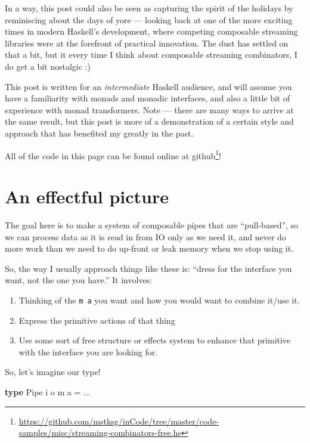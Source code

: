 \documentclass[]{article}
\newenvironment{Shaded}{}{}
\newcommand{\DataTypeTok}[1]{\textcolor[rgb]{0.56,0.13,0.00}{#1}}
\newcommand{\KeywordTok}[1]{\textcolor[rgb]{0.00,0.44,0.13}{\textbf{#1}}}
\newcommand{\NormalTok}[1]{#1}
\newcommand{\OperatorTok}[1]{\textcolor[rgb]{0.40,0.40,0.40}{#1}}
\newcommand{\OtherTok}[1]{\textcolor[rgb]{0.00,0.44,0.13}{#1}}
\renewcommand{\href}[2]{#2\footnote{\url{#1}}}
\begin{document}
In a way, this post could also be seen as capturing the spirit of the holidays
by reminiscing about the days of yore --- looking back at one of the more
exciting times in modern Haskell's development, where competing composable
streaming libraries were at the forefront of practical innovation. The dust has
settled on that a bit, but it every time I think about composable streaming
combinators, I do get a bit nostalgic :)

This post is written for an \emph{intermediate} Haskell audience, and will
assume you have a familiarity with monads and monadic interfaces, and also a
little bit of experience with monad transformers. Note --- there are many ways
to arrive at the same result, but this post is more of a demonstration of a
certain style and approach that has benefited my greatly in the past.

All of the code in this page
\href{https://github.com/mstksg/inCode/tree/master/code-samples/misc/streaming-combinators-free.hs}{can
be found online at github}!

\hypertarget{an-effectful-picture}{%
\section{An effectful picture}\label{an-effectful-picture}}

The goal here is to make a system of composable pipes that are ``pull-based'',
so we can process data as it is read in from IO only as we need it, and never do
more work than we need to do up-front or leak memory when we stop using it.

So, the way I usually approach things like these is: ``dress for the interface
you want, not the one you have.'' It involves:

\begin{enumerate}
\def\labelenumi{\arabic{enumi}.}
\tightlist
\item
  Thinking of the \texttt{m\ a} you want and how you would want to combine
  it/use it.
\item
  Express the primitive actions of that thing
\item
  Use some sort of free structure or effects system to enhance that primitive
  with the interface you are looking for.
\end{enumerate}

So, let's imagine our type!

\begin{Shaded}
\begin{Highlighting}[]
\KeywordTok{type} \DataTypeTok{Pipe}\NormalTok{ i o m a }\OtherTok{=} \OperatorTok{...}
\end{Highlighting}
\end{Shaded}
\end{document}
